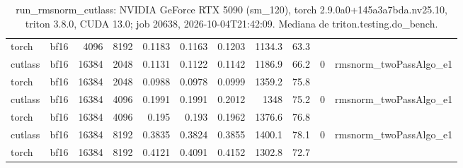 \begin{table}[htbp]
\begin{tabular}{llrrrrrrrll}
    torch & bf16 & 4096 & 8192 & 0.1183 & 0.1163 & 0.1203 & 1134.3 & 63.3 &  &  \\
    cutlass & bf16 & 16384 & 2048 & 0.1131 & 0.1122 & 0.1142 & 1186.9 & 66.2 & 0 & rmsnorm\_twoPassAlgo\_e1 \\
    torch & bf16 & 16384 & 2048 & 0.0988 & 0.0978 & 0.0999 & 1359.2 & 75.8 &  &  \\
    cutlass & bf16 & 16384 & 4096 & 0.1991 & 0.1991 & 0.2012 & 1348 & 75.2 & 0 & rmsnorm\_twoPassAlgo\_e1 \\
    torch & bf16 & 16384 & 4096 & 0.195 & 0.193 & 0.1962 & 1376.6 & 76.8 &  &  \\
    cutlass & bf16 & 16384 & 8192 & 0.3835 & 0.3824 & 0.3855 & 1400.1 & 78.1 & 0 & rmsnorm\_twoPassAlgo\_e1 \\
    torch & bf16 & 16384 & 8192 & 0.4121 & 0.4091 & 0.4152 & 1302.8 & 72.7 &  &  \\
    \bottomrule
  \end{tabular}
  \caption{run\_rmsnorm\_cutlass: NVIDIA GeForce RTX 5090 (sm\_120), torch 2.9.0a0+145a3a7bda.nv25.10, triton 3.8.0, CUDA 13.0; job 20638, 2026-10-04T21:42:09. Mediana de triton.testing.do\_bench.}
  \label{tab:pascal-run-rmsnorm-cutlass}
\end{table}
